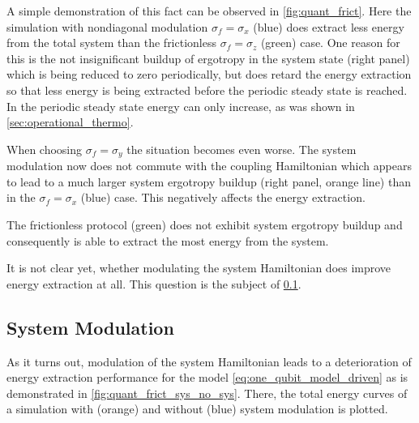 A simple demonstration of this fact can be observed in
\cref{fig:quant_frict}. Here the simulation with nondiagonal
modulation \(σ_{f}=σ_{x}\) (blue) does extract less energy from the
total system than the frictionless \(σ_{f}=σ_{z}\) (green) case. One
reason for this is the not insignificant buildup of ergotropy in the
system state (right panel) which is being reduced to zero
periodically, but does retard the energy extraction so that less
energy is being extracted before the periodic steady state is
reached. In the periodic steady state energy can only increase, as was
shown in \cref{sec:operational_thermo}.

When choosing \(σ_{f}=σ_{y}\) the situation becomes even worse. The
system modulation now does not commute with the coupling Hamiltonian
which appears to lead to a much larger system ergotropy buildup (right
panel, orange line) than in the \(σ_{f}=σ_{x}\) (blue) case.  This
negatively affects the energy extraction.

The frictionless protocol (green) does not exhibit system ergotropy
buildup and consequently is able to extract the most energy from the
system.

It is not clear yet, whether modulating the system Hamiltonian does
improve energy extraction at all. This question is the subject of
\cref{sec:sys_mod_v_no_sys_mod}.

\subsection{System Modulation}
\label{sec:sys_mod_v_no_sys_mod}
As it turns out, modulation of the system Hamiltonian leads to a
deterioration of energy extraction performance for the model
\cref{eq:one_qubit_model_driven} as is demonstrated in
\cref{fig:quant_frict_sys_no_sys}. There, the total energy curves of a
simulation with (orange) and without (blue) system modulation is
plotted.

